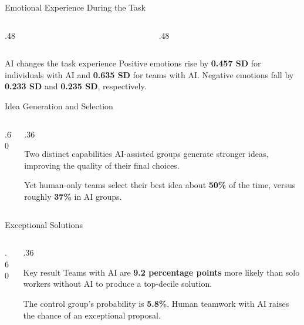 \begin{frame}[t]{Emotional Experience During the Task}
\small
\begin{columns}[T,onlytextwidth]
\begin{column}{.48\textwidth}
\end{column}
\begin{column}{.48\textwidth}
\end{column}
\end{columns}
\vspace{0.35cm}
\begin{alertblock}{AI changes the task experience}
Positive emotions rise by \textbf{0.457 SD} for individuals with AI and \textbf{0.635 SD} for teams with AI. Negative emotions fall by \textbf{0.233 SD} and \textbf{0.235 SD}, respectively.
\end{alertblock}
\end{frame}

\begin{frame}[t]{Idea Generation and Selection}
\small
\begin{columns}[T,onlytextwidth]
\begin{column}{.60\textwidth}
\end{column}
\begin{column}{.36\textwidth}
\begin{block}{Two distinct capabilities}
AI-assisted groups generate stronger ideas, improving the quality of their final choices.
\end{block}
\medskip
Yet human-only teams select their best idea about \textbf{50\%} of the time, versus roughly \textbf{37\%} in AI groups.
\end{column}
\end{columns}
\end{frame}

\begin{frame}[t]{Exceptional Solutions}
\small
\begin{columns}[T,onlytextwidth]
\begin{column}{.60\textwidth}
\end{column}
\begin{column}{.36\textwidth}
\begin{block}{Key result}
Teams with AI are \textbf{9.2 percentage points} more likely than solo workers without AI to produce a top-decile solution.
\end{block}
\medskip
The control group's probability is \textbf{5.8\%}. Human teamwork with AI raises the chance of an exceptional proposal.
\end{column}
\end{columns}
\end{frame}
